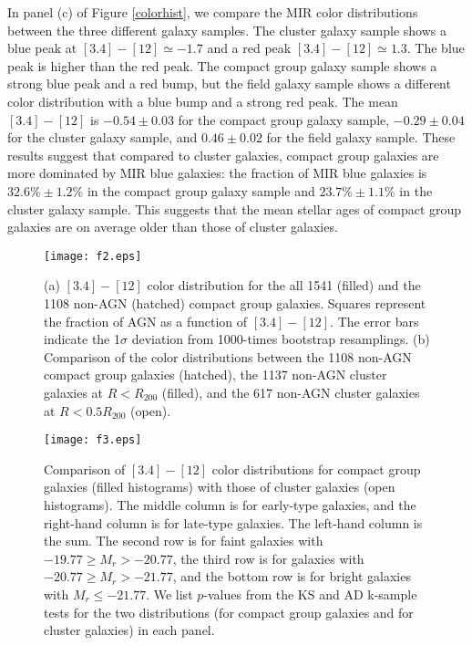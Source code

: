 \documentclass[12pt,preprint,apj]{emulateapj}
\newcommand{\rvir}{R_{200}}
\begin{document}
In panel (c) of Figure \ref{colorhist}, we compare the MIR color distributions between 
the three different galaxy samples. The cluster galaxy sample shows a blue peak 
at $[3.4]-[12]\simeq-1.7$ and a red peak $[3.4]-[12]\simeq1.3$. 
The blue peak is higher than the red peak. 
The compact group galaxy sample shows a strong blue peak and a red bump, 
but the field galaxy sample shows a different color distribution with a blue bump 
and a strong red peak.
The mean $[3.4]-[12]$ is $-0.54\pm0.03$ for the compact group galaxy sample, 
$-0.29\pm0.04$ for the cluster galaxy sample, 
and $0.46\pm0.02$ for the field galaxy sample. 
These results suggest that compared to cluster galaxies, 
compact group galaxies are more dominated by MIR blue galaxies:
the fraction of MIR blue galaxies is $32.6\%\pm1.2\%$ 
in the compact group galaxy sample and $23.7\%\pm1.1\%$ in the cluster 
galaxy sample. 
This suggests that the mean stellar ages of compact group galaxies are on 
average older than those of cluster galaxies.

\begin{figure}
\centering
\texttt{[image: f2.eps]}
\caption{(a) $[3.4]-[12]$ color distribution for the all 1541 (filled) and the 1108 non-AGN 
(hatched) compact group galaxies. Squares represent the fraction of 
AGN as a function of $[3.4]-[12]$. The error bars indicate the 1$\sigma$ 
deviation from 1000-times bootstrap resamplings.
(b) Comparison of the color distributions between the 1108 non-AGN compact group
galaxies (hatched), the 1137 non-AGN cluster galaxies at $R<\rvir$ (filled), 
and the 617 non-AGN cluster galaxies at $R<0.5\rvir$ (open).
}
\label{w13abhist_agn}
\end{figure}

\begin{figure*}
\centering
\texttt{[image: f3.eps]}
\caption{Comparison of $[3.4]-[12]$ color distributions for 
compact group galaxies (filled histograms) with those of cluster galaxies 
(open histograms). 
The middle column is for early-type galaxies, and the right-hand column 
is for late-type galaxies. The left-hand column is the sum. 
The second row is for faint galaxies with $-19.77\geq M_r > -20.77$, 
the third row is for galaxies with $-20.77\geq M_r > -21.77$, 
and the bottom row is for bright galaxies with $M_r \leq -21.77$.  
We list $p$-values from the KS and AD k-sample tests for the two distributions 
(for compact group galaxies and for cluster galaxies) in each panel.
}
\label{w13abhist_morph_maglim}
\end{figure*}
\end{document}
